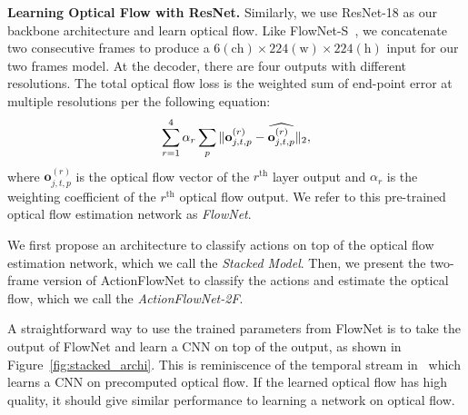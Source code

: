 \documentclass[10pt,twocolumn,letterpaper]{article}
\begin{document}
\noindent\textbf{Learning Optical Flow with ResNet.}
Similarly, we use ResNet-18 as our backbone architecture and learn optical flow.
Like FlowNet-S~\cite{FischerDIHHGSCB15}, we concatenate two consecutive frames to produce a $6(\text{ch})\times224(\text{w})\times224(\text{h})$ input for our two frames model.
At the decoder, there are four outputs with different resolutions.
The total optical flow loss is the weighted sum of end-point error at multiple resolutions per the following equation:
\vspace{-.5em}\begin{equation}
    \sum_{r=1}^{4} \alpha_r \sum_{p} \|\mathbf{o}_{j,t,p}^{(r)} - \widehat{\mathbf{o}_{j,t,p}^{(r)}} \|_2,
	\label{eq:loss_epe}
\vspace{-.5em}
\end{equation}%
where $\mathbf{o}_{j,t,p}^{(r)}$ is the optical flow vector of the $r^\text{th}$ layer output and
$\alpha_r$ is the weighting coefficient of the $r^\text{th}$ optical flow output.
We refer to this pre-trained optical flow estimation network as \emph{FlowNet}.

We first propose an architecture to classify actions on top of the optical flow estimation network, which we call the \emph{Stacked Model}.
Then, we present the two-frame version of ActionFlowNet to classify the actions and estimate the
optical flow, which we call the \emph{ActionFlowNet-2F}.

A straightforward way to use the trained parameters from FlowNet is to take the output of FlowNet and learn a CNN on top of the output, as shown in Figure~\ref{fig:stacked_archi}.
This is reminiscence of the temporal stream in~\cite{simonyanZ14a} which learns a CNN on precomputed optical flow.
If the learned optical flow has high quality, it should give similar performance to learning a network on optical flow.
\end{document}
